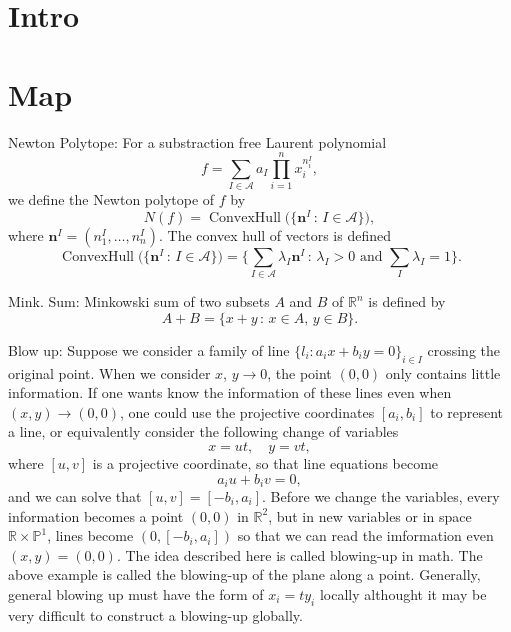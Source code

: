 \documentclass[12pt]{article}
\theoremstyle{definition}
\theoremstyle{plain}
\begin{document}
\section{Intro}

\section{Map}

Newton Polytope: For a substraction free Laurent polynomial 
\[
	f = \sum_{I\in \mathscr A} a_I \prod_{i=1}^n x_i^{n^I_i},
\]
we define the Newton polytope of $f$ by
\[
	N(f)=\operatorname{ConvexHull}\bigl(\{\mathbf n^I\,:\, I\in \mathscr A\}\bigr),
\]
where $\mathbf n^I=(n^I_1,\dots,n^I_n)$. The convex hull of vectors is defined
\[
	\operatorname{ConvexHull}\bigl(\{\mathbf n^I\,:\, I\in \mathscr A\}\bigr)
	=\Biggl\{\sum_{I\in\mathscr A}\lambda_I \mathbf n^I\,:\,\text{$\lambda_I>0$ and $\sum_I\lambda_I=1$}\Biggr\}.
\] 

Mink. Sum: Minkowski sum of two subsets $A$ and $B$ of $\mathbb R^n$ is defined by 
\[
	A+B=\{x+y\,:\,x\in A,\, y\in B\}.
\] 

Blow up: Suppose we consider a family of line $\{l_i: a_ix+b_iy=0\}_{i\in I}$ crossing 
the original point. When we consider $x$, $y\to 0$, the point $(0,0)$ only contains 
little information. If one wants know the information of these lines even when $(x,y)\to (0,0)$,
one could use the projective coordinates $[a_i,b_i]$ to represent a line, or equivalently 
consider the following change of variables
\[
x=ut,\quad y=vt,
\] 
where $[u,v]$ is a projective coordinate, so that line equations become 
\[
	a_i u + b_i v = 0,
\]
and we can solve that $[u,v]=[-b_i,a_i]$. Before we change the variables, every information 
becomes a point $(0,0)$ in $\mathbb R^2$, but in new variables or in space 
$\mathbb R\times \mathbb P^1$, lines become $(0,[-b_i,a_i])$ so that we can read the imformation
even $(x,y)=(0,0)$. The idea described here is called blowing-up in math.  
The above example is called the blowing-up of the plane along a point. Generally,
general blowing up must have the form of $x_i=ty_i$ locally althought it may be very difficult
to construct a blowing-up globally.
\end{document}
